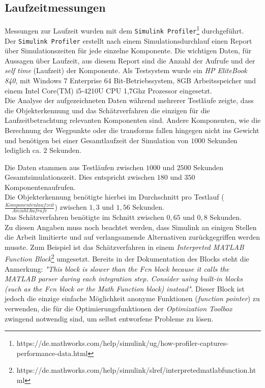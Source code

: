 \subsection{Laufzeitmessungen}
\label{sec_laufzeit}
Messungen zur Laufzeit wurden mit dem \texttt{Simulink Profiler}\footnote{https://de.mathworks.com/help/simulink/ug/how-profiler-captures-performance-data.html} durchgeführt.\\ Der \texttt{Simulink Profiler} erstellt nach einem Simulationsdurchlauf einen Report über Simulationszeiten für jede einzelne Komponente. Die wichtigen Daten, für Aussagen über Laufzeit, aus diesem Report sind die Anzahl der Aufrufe und der \textit{self time} (Laufzeit) der Komponente. Als Testsystem wurde ein \textit{HP EliteBook 840}, mit Windows 7 Enterprise 64 Bit-Betriebssystem, $8$GB Arbeitsspeicher und einem Intel Core(TM) i5-4210U CPU 1,7Ghz Prozessor eingesetzt. \\
Die Analyse der aufgezeichneten Daten während mehrerer Testläufe zeigte, dass die Objekterkennung und das Schätzverfahren die einzigen für die Laufzeitbetrachtung relevanten Komponenten sind. Andere Komponenten, wie die Berechnung der Wegpunkte oder die \glspl{transform} fallen hingegen nicht ins Gewicht und benötigen bei einer Gesamtlaufzeit der Simulation von $1000$ Sekunden lediglich ca. $2$ Sekunden. 

Die Daten stammen aus Testläufen zwischen $1000$ und $2500$ Sekunden Gesamtsimulationszeit. Dies entspricht zwischen $180$ und $350$ Komponentenaufrufen.\\
Die Objekterkennung benötigte hierbei im Durchschnitt pro Testlauf ($\frac{Komponentenlaufzeit}{Anzahl Aufrufe}$) zwischen $1,3$ und $1,56$ Sekunden.\\
Das Schätzverfahren benötigte im Schnitt zwischen $0,65$ und $0,8$ Sekunden.\\

Zu diesen Angaben muss noch beachtet werden, dass Simulink an einigen Stellen die Arbeit limitierte und auf verlangsamende Alternativen zurückgegriffen werden musste. Zum Beispiel ist das Schätzverfahren in einem \textit{Interpreted MATLAB Function Block}\footnote{https://de.mathworks.com/help/simulink/slref/interpretedmatlabfunction.html} umgesetzt. Bereits in der Dokumentation des Blocks steht die Anmerkung: \textit{"This block is slower than the Fcn block because it calls the MATLAB parser during each integration step. Consider using built-in blocks (such as the Fcn block or the Math Function block) instead"}. Dieser Block ist jedoch die einzige einfache Möglichkeit anonyme Funktionen (\textit{function pointer}) zu verwenden, die für die Optimierungsfunktionen der \textit{Optimization Toolbox} zwingend notwendig sind, um selbst entworfene Probleme zu lösen.
\afterpage{\null\newpage}

%
